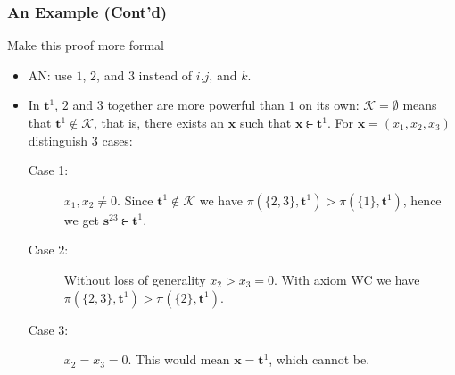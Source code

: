 \documentclass{beamer}
\def\squeeze#1{\SperrRest#1\endlistxxx}
\def\sperrdist{0.1ex}
\def\endlistxxx{\endlistxxx}
\def\SperrRest{\afterassignment\SperrZeichen\let\next= }
\def\SperrZeichen{\ifx\next\endlistxxx\let\next\relax\kern\sperrdist
                  \else\next\kern-\sperrdist\let\next\SperrRest\fi\next}
\begin{document}
\begin{frame}
\frametitle{An Example (Cont'd)}
Make this proof more formal

\begin{itemize}
\item AN: use $1$, $2$, and $3$ instead of $i$,$j$, and $k$.  

\item In $\bm{t}^1$, $2$ and $3$ together are more powerful than $1$
  on its own: $\mathcal{K} = \emptyset$
  means that $\bm{t}^1\notin\mathcal{K}$, that is, there exists an
  $\bm{x}$ such that $\bm{x} \strictfi\bm{t}^1$. 
  For $\bm{x}=(x_1,x_2,x_3)$  distinguish 3 cases:
\begin{description}
\item[Case 1:] $x_1,x_2\neq 0$. Since $\bm{t}^1\notin\mathcal{K}$ we
  have $\pi(\{2,3\},\bm{t}^1)>\pi(\{1\},\bm{t}^1)$, hence we get
  $\bm{s}^{23}\strictfi\bm{t}^1$.

\item[Case 2:] Without loss of generality $x_2>x_3=0$.
With axiom WC we have $\pi(\{2,3\},\bm{t}^1)>\pi(\{2\},\bm{t}^1)$.

\item[Case 3:] $x_2=x_3=0$. This would mean $\bm{x}=\bm{t}^1$, which
  cannot be.
\end{description}
\end{itemize}

\end{frame}

\def\squeezetext#1{\text{\squeeze{#1}}}
\end{document}
